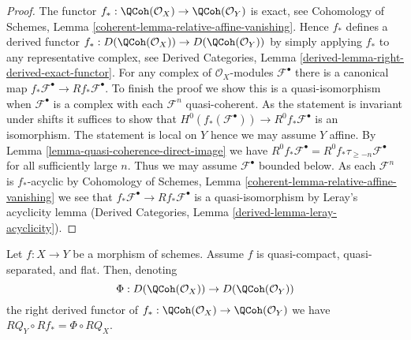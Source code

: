 \begin{proof}
The functor
$f_* : \QCoh(\mathcal{O}_X) \to \QCoh(\mathcal{O}_Y)$
is exact, see
Cohomology of Schemes, Lemma \ref{coherent-lemma-relative-affine-vanishing}.
Hence $f_*$ defines a derived functor
$f_* : D(\QCoh(\mathcal{O}_X)) \to D(\QCoh(\mathcal{O}_Y))$
by simply applying $f_*$ to any representative complex, see
Derived Categories, Lemma \ref{derived-lemma-right-derived-exact-functor}.
For any complex of $\mathcal{O}_X$-modules
$\mathcal{F}^\bullet$ there is a canonical map
$f_*\mathcal{F}^\bullet \to Rf_*\mathcal{F}^\bullet$.
To finish the proof we show this is a quasi-isomorphism when
$\mathcal{F}^\bullet$ is a complex with each $\mathcal{F}^n$
quasi-coherent. As the statement is invariant under shifts it
suffices to show that
$H^0(f_*(\mathcal{F}^\bullet)) \to R^0f_*\mathcal{F}^\bullet$
is an isomorphism. The statement is local on $Y$ hence we
may assume $Y$ affine. By
Lemma \ref{lemma-quasi-coherence-direct-image}
we have $R^0f_*\mathcal{F}^\bullet = R^0f_*\tau_{\geq -n}\mathcal{F}^\bullet$
for all sufficiently large $n$. Thus we may assume $\mathcal{F}^\bullet$
bounded below. As each $\mathcal{F}^n$ is $f_*$-acyclic by
Cohomology of Schemes, Lemma \ref{coherent-lemma-relative-affine-vanishing}
we see that
$f_*\mathcal{F}^\bullet \to Rf_*\mathcal{F}^\bullet$
is a quasi-isomorphism by
Leray's acyclicity lemma (Derived Categories, Lemma
\ref{derived-lemma-leray-acyclicity}).
\end{proof}

\begin{lemma}
\label{lemma-flat-pushforward-coherator}
Let $f : X \to Y$ be a morphism of schemes. Assume $f$ is
quasi-compact, quasi-separated, and flat. Then, denoting
$$
\Phi : D(\QCoh(\mathcal{O}_X)) \to D(\QCoh(\mathcal{O}_Y))
$$
the right derived functor of
$f_* : \QCoh(\mathcal{O}_X) \to \QCoh(\mathcal{O}_Y)$
we have $RQ_Y \circ Rf_* = \Phi \circ RQ_X$.
\end{lemma}


